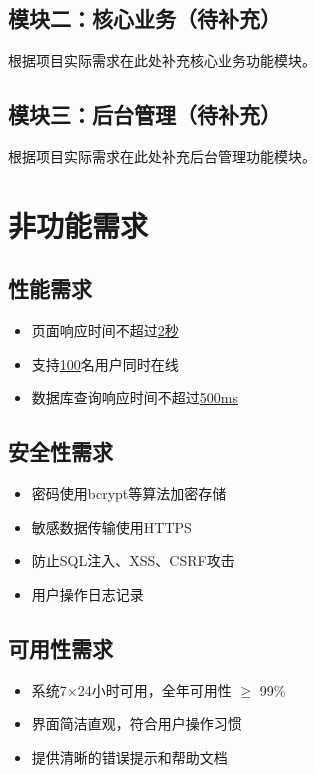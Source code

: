 \documentclass[12pt,a4paper]{ctexart}
\begin{document}
\subsection{模块二：核心业务（待补充）}
根据项目实际需求在此处补充核心业务功能模块。

\subsection{模块三：后台管理（待补充）}
根据项目实际需求在此处补充后台管理功能模块。

\section{非功能需求}
\subsection{性能需求}
\begin{itemize}
    \item 页面响应时间不超过\underline{2秒}
    \item 支持\underline{100}名用户同时在线
    \item 数据库查询响应时间不超过\underline{500ms}
\end{itemize}

\subsection{安全性需求}
\begin{itemize}
    \item 密码使用bcrypt等算法加密存储
    \item 敏感数据传输使用HTTPS
    \item 防止SQL注入、XSS、CSRF攻击
    \item 用户操作日志记录
\end{itemize}

\subsection{可用性需求}
\begin{itemize}
    \item 系统7×24小时可用，全年可用性 $\ge$ 99\%
    \item 界面简洁直观，符合用户操作习惯
    \item 提供清晰的错误提示和帮助文档
\end{itemize}
\end{document}
